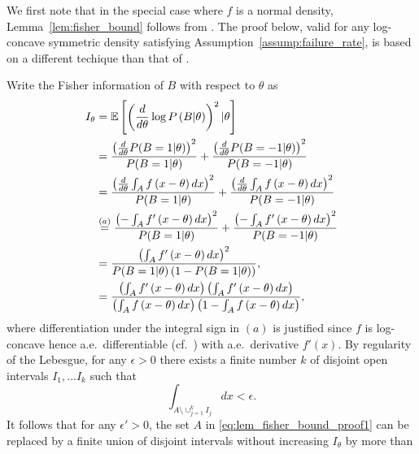 \begin{proof-of-lemma}[\ref{lem:fisher_bound}]  
  We first note that in the special case where $f$ is a normal density, Lemma~\ref{lem:fisher_bound} follows from \cite[Thm.~3]{Barnes2018}. The proof below, valid for any log-concave symmetric density satisfying Assumption~\ref{assump:failure_rate}, is based on a different techique than that of \cite{Barnes2018}. \par
  Write the Fisher information of $B$ with respect to $\theta$ as
  \begin{align}
    I_\theta & =  \mathbb{E}\left[  \left( \frac{d}{d\theta} \log P\left( B | \theta \right) \right)^2 |\theta \right] \nonumber \\
    & = \frac{ \left(\frac{d}{d\theta} P(B=1|\theta) \right)^2}{P(B=1| \theta)} + \frac{ \left(\frac{d}{d\theta} P(B=-1|\theta) \right)^2} {P(B=-1| \theta)} \nonumber \\
    & =  \frac{ \left( \frac{d}{d\theta} \int_A f \left( x-\theta\right)dx \right)^2} { P(B=1| \theta) } + \frac{ \left( \frac{d}{d\theta}\int_A f \left( x-\theta \right)dx \right)^2} { P(B=-1| \theta) } \nonumber \\ 
    & \overset{(a)}{=} \frac{ \left( - \int_A f' \left( x-\theta \right)dx \right)^2} { P(B=1| \theta) } + \frac{ \left(- \int_A f' \left( x-\theta \right)dx \right)^2} { P(B=-1| \theta) } \nonumber \\ 
    & = \frac{\left( \int_A f'\left( x-\theta \right) dx \right)^2 }{  P(B=1 | \theta) \left(1-P(B=1|\theta) \right)  }, \nonumber \\
    & = \frac{\left( \int_A f'\left( x-\theta \right) dx \right) \left( \int_A f'\left( x-\theta \right) dx \right)}{ \left( \int_A f \left( x-\theta \right) dx \right)  \left(1- \int_A f \left( x-\theta \right) dx \right) }, \label{eq:lem_fisher_bound_proof1}
  \end{align}
  where differentiation under the integral sign in $(a)$ is justified since $f$ is log-concave hence a.e.\ differentiable
  (cf.~\cite{Bertsekas73}) with a.e.\ derivative $f'(x)$. By regularity of the Lebesgue, for any $\epsilon>0$ there exists a finite number $k$ of disjoint open intervals $I_1,\ldots I_k$ such that
  \begin{equation*}
    \int_{A\setminus \cup_{j=1}^k I_j }  dx < \epsilon.
  \end{equation*}
  It follows that for any $\epsilon' > 0$, the set $A$ in
  \eqref{eq:lem_fisher_bound_proof1} can be replaced by a finite union of disjoint intervals without increasing $I_\theta$ by more than

\end{proof-of-lemma}
